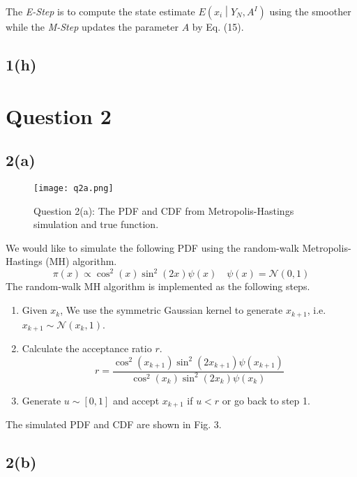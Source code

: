 \documentclass[a4paper, 11pt]{article}
\begin{document}
The \textit{E-Step} is to compute the state estimate $E\left(x_i\middle| Y_N, A^I \right)$ using the smoother while the \textit{M-Step} updates the parameter $A$ by Eq. (15). 




\subsection*{1(h)}








\section*{Question 2}
\subsection*{2(a)}


\begin{figure}
	\begin{center}
		\texttt{[image: q2a.png]}
		\caption{Question 2(a): The PDF and CDF from Metropolis-Hastings simulation and true function. }
	\end{center}
\end{figure}

We would like to simulate the following PDF using the random-walk Metropolis-Hastings (MH) algorithm. 
\begin{equation}
\pi(x) \propto \cos^2(x)\sin^2(2x)\psi(x) \quad \psi(x) = \mathcal{N}(0,1)
\end{equation}
The random-walk MH algorithm is implemented as the following steps. 
\begin{enumerate}
\item Given $x_k$, We use the symmetric Gaussian kernel to generate $x_{k+1}$, i.e. $x_{k+1}\sim\mathcal{N}(x_k, 1)$. 
\item Calculate the acceptance ratio $r$. 
\begin{equation}
r = \frac{\cos^2(x_{k+1})\sin^2(2x_{k+1})\psi(x_{k+1})}{\cos^2(x_k)\sin^2(2x_k)\psi(x_k)}
\end{equation}
\item Generate $u\sim [0,1]$ and accept $x_{k+1}$ if $u < r$ or go back to step 1. 
\end{enumerate}
The simulated PDF and CDF are shown in Fig. 3. 



\subsection*{2(b)}
\end{document}
